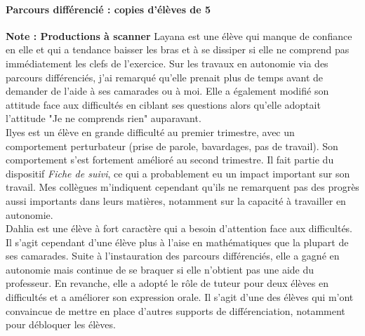 \paragraph{Parcours différencié : copies d'élèves de 5 \\}
\textbf{\color{red}Note : Productions à scanner}
Layana est une élève qui manque de confiance en elle et qui a tendance  baisser les bras et à se dissiper si elle ne comprend pas immédiatement les clefs de l'exercice. Sur les travaux en autonomie via des parcours différenciés, j'ai remarqué qu'elle prenait plus de temps avant de demander de l'aide à ses camarades ou à moi. Elle a également modifié son attitude face aux difficultés en ciblant ses questions alors qu'elle adoptait l'attitude "Je ne comprends rien" auparavant.\\
Ilyes est un élève en grande difficulté au premier trimestre, avec un comportement perturbateur (prise de parole, bavardages, pas de travail). Son comportement s'est fortement amélioré au second trimestre. Il fait partie du dispositif \textit{Fiche de suivi}, ce qui a probablement eu un impact important sur son travail. Mes collègues m'indiquent cependant qu'ils ne remarquent pas des progrès aussi importants dans leurs matières, notamment sur la capacité à travailler en autonomie.\\
Dahlia est une élève à fort caractère qui a besoin d'attention face aux difficultés. Il s'agit cependant d'une élève plus à l'aise en mathématiques que la plupart de ses camarades. Suite à l'instauration des parcours différenciés, elle a gagné en autonomie mais continue de se braquer si elle n'obtient pas une aide du professeur. En revanche, elle a adopté le rôle de tuteur pour deux élèves en difficultés et a améliorer son expression orale. Il s'agit d'une des élèves qui m'ont convaincue de mettre en place d'autres supports de différenciation, notamment pour débloquer les élèves.

